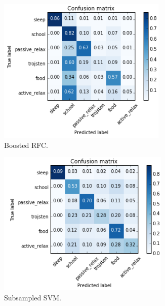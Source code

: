 \documentclass[a4paper, 12pt]{article}
\begin{document}
\begin{figure}[H]
\begin{subfigure}{.5\textwidth}
  \centering
  \includegraphics[width=1\linewidth]{cm3.png}
  \caption{Boosted RFC.}
\end{subfigure}
\begin{subfigure}{.5\textwidth}
  \centering
  \includegraphics[width=1\linewidth]{cm4.png}
  \caption{Subsampled SVM.}
\end{subfigure}%
\begin{subfigure}{.5\textwidth}
  \centering

\end{subfigure}
\end{figure}
\end{document}
